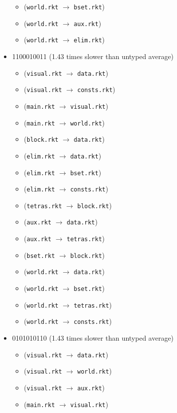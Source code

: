\documentclass{article}
\newcommand{\mono}[1]{\texttt{#1}}
\begin{document}
\begin{itemize}
\begin{itemize}
  \item (\mono{world.rkt} $\rightarrow$ \mono{bset.rkt})
  \item (\mono{world.rkt} $\rightarrow$ \mono{aux.rkt})
  \item (\mono{world.rkt} $\rightarrow$ \mono{elim.rkt})
  \end{itemize}
\item 1100010011 (1.43 times slower than untyped average)
  \begin{itemize}
  \item (\mono{visual.rkt} $\rightarrow$ \mono{data.rkt})
  \item (\mono{visual.rkt} $\rightarrow$ \mono{consts.rkt})
  \item (\mono{main.rkt} $\rightarrow$ \mono{visual.rkt})
  \item (\mono{main.rkt} $\rightarrow$ \mono{world.rkt})
  \item (\mono{block.rkt} $\rightarrow$ \mono{data.rkt})
  \item (\mono{elim.rkt} $\rightarrow$ \mono{data.rkt})
  \item (\mono{elim.rkt} $\rightarrow$ \mono{bset.rkt})
  \item (\mono{elim.rkt} $\rightarrow$ \mono{consts.rkt})
  \item (\mono{tetras.rkt} $\rightarrow$ \mono{block.rkt})
  \item (\mono{aux.rkt} $\rightarrow$ \mono{data.rkt})
  \item (\mono{aux.rkt} $\rightarrow$ \mono{tetras.rkt})
  \item (\mono{bset.rkt} $\rightarrow$ \mono{block.rkt})
  \item (\mono{world.rkt} $\rightarrow$ \mono{data.rkt})
  \item (\mono{world.rkt} $\rightarrow$ \mono{bset.rkt})
  \item (\mono{world.rkt} $\rightarrow$ \mono{tetras.rkt})
  \item (\mono{world.rkt} $\rightarrow$ \mono{consts.rkt})
  \end{itemize}
\item 0101010110 (1.43 times slower than untyped average)
  \begin{itemize}
  \item (\mono{visual.rkt} $\rightarrow$ \mono{data.rkt})
  \item (\mono{visual.rkt} $\rightarrow$ \mono{world.rkt})
  \item (\mono{visual.rkt} $\rightarrow$ \mono{aux.rkt})
  \item (\mono{main.rkt} $\rightarrow$ \mono{visual.rkt})

\end{itemize}
\end{itemize}
\end{document}
